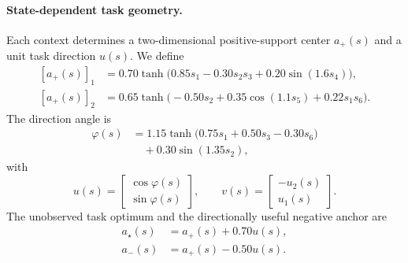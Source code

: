 \paragraph{State-dependent task geometry.}
Each context determines a two-dimensional positive-support center
$a_+(s)$ and a unit task direction $u(s)$. We define
\begin{equation}
\begin{aligned}
    [a_+(s)]_1
    &=
    0.70
    \tanh
    \bigl(
        0.85s_1
        -
        0.30s_2s_3
        +
        0.20\sin(1.6s_4)
    \bigr), \\
    [a_+(s)]_2
    &=
    0.65
    \tanh
    \bigl(
        -0.50s_2
        +
        0.35\cos(1.1s_5)
        +
        0.22s_1s_6
    \bigr).
\end{aligned}
\label{eq:cu1_positive_center}
\end{equation}
The direction angle is
\begin{equation}
\begin{aligned}
    \varphi(s)
    &=
    1.15
    \tanh
    \bigl(
        0.75s_1
        +
        0.50s_3
        -
        0.30s_6
    \bigr) \\
    &\quad+
    0.30\sin(1.35s_2),
\end{aligned}
\label{eq:cu1_direction_angle}
\end{equation}
with
\begin{equation}
    u(s)
    =
    \begin{bmatrix}
        \cos\varphi(s)\\
        \sin\varphi(s)
    \end{bmatrix},
    \qquad
    v(s)
    =
    \begin{bmatrix}
        -u_2(s)\\
        u_1(s)
    \end{bmatrix}.
    \label{eq:cu1_task_basis}
\end{equation}
The unobserved task optimum and the directionally useful negative anchor
are
\begin{equation}
\begin{aligned}
    a_\star(s)
    &=
    a_+(s)+0.70u(s), \\
    a_-(s)
    &=
    a_+(s)-0.50u(s).
\end{aligned}
\label{eq:cu1_task_points}
\end{equation}

